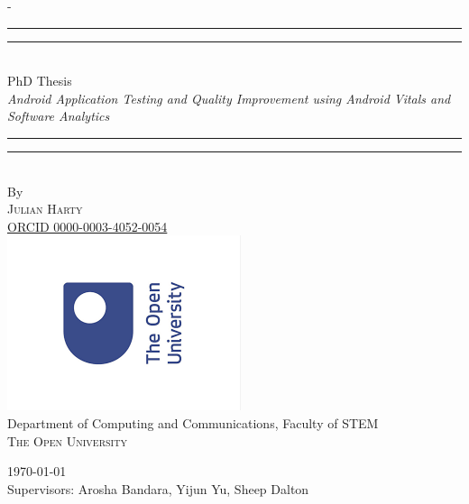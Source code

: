 \begin{titlingpage}
\begin{SingleSpace}
\calccentering{\unitlength} 
\begin{adjustwidth*}{\unitlength}{-\unitlength}
\vspace*{13mm}
\begin{center}
\rule[0.5ex]{\linewidth}{2pt}\vspace*{-\baselineskip}\vspace*{3.2pt}
\rule[0.5ex]{\linewidth}{1pt}\\[\baselineskip]
{\HUGE PhD Thesis}\\[4mm]
{\Large \textit{Android Application Testing and Quality Improvement using Android Vitals and Software Analytics}}\\
\rule[0.5ex]{\linewidth}{1pt}\vspace*{-\baselineskip}\vspace{3.2pt}
\rule[0.5ex]{\linewidth}{2pt}\\
\vspace{6.5mm}
{\large By}\\
\vspace{6.5mm}
{\large\textsc{Julian Harty}}\\
\href{https://orcid.org/0000-0003-4052-0054}{ORCID 0000-0003-4052-0054}\\
\vspace{11mm}
\includegraphics[scale=0.6]{images/ou-logo.png}\\
\vspace{6mm}
{\large Department of Computing and Communications, Faculty of STEM\\
\textsc{The Open University}}\\
\vspace{11mm}

\vspace{9mm}
{\large\textsc{\today}}\\
\vspace{12mm}
{\large Supervisors: Arosha Bandara, Yijun Yu, Sheep Dalton}

\end{center}
\end{adjustwidth*}
\end{SingleSpace}
\end{titlingpage}